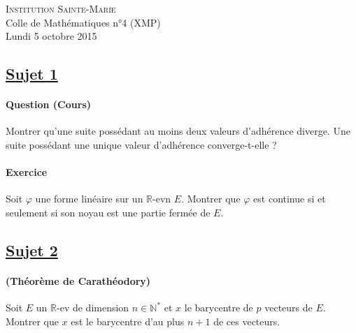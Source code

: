 \documentclass[12pt,a4paper]{report}
\begin{document}
\newcommand{\rA}{\mathcal{A}}
\newcommand{\rB}{\mathcal{B}}
\newcommand{\rC}{\mathcal{C}}
\newcommand{\rG}{\mathcal{G}}
\newcommand{\rF}{\mathcal{F}}
\newcommand{\rP}{\mathcal{P}}
\newcommand{\rH}{\mathcal{H}}
\newcommand{\rR}{\mathcal{R}}
\newcommand{\rE}{\mathcal{E}}
\newcommand{\rL}{\mathcal{L}}
\newcommand{\rM}{\mathcal{M}}
\newcommand{\bK}{\mathbb{K}}
\newcommand{\bQ}{\mathbb{Q}}
\newcommand{\bR}{\mathbb{R}}
\newcommand{\bZ}{\mathbb{Z}}
\newcommand{\bN}{\mathbb{N}}
\newcommand{\bC}{\mathbb{C}}
\newcommand{\bP}{\mathbb{P}}
\newcommand{\bF}{\mathbb{F}}

\ifpdf
{}
\else
{}
\fi

\pagestyle{empty} %

\noindent \textsc{Institution Sainte-Marie}\\
Colle de Mathématiques n°4 (XMP)\\
Lundi 5 octobre 2015


\subsection*{\underline{Sujet 1}}
\paragraph*{Question (Cours)} %
Montrer qu'une suite possédant au moins deux valeurs d'adhérence diverge. Une suite possédant une unique valeur d'adhérence converge-t-elle ? 

\paragraph*{Exercice} %
Soit $\varphi$ une forme linéaire sur un $\bR$-evn $E$. Montrer que $\varphi$ est continue si et seulement si son noyau est une partie fermée de $E$.

\subsection*{\underline{Sujet 2}} %

\paragraph*{(Théorème de Carathéodory)} 
Soit $E$ un $\bR$-ev de dimension $n\in \bN^*$ et $x$ le barycentre de $p$ vecteurs de $E$. Montrer que $x$ est le barycentre d'au plus $n+1$ de ces vecteurs.
\end{document}
